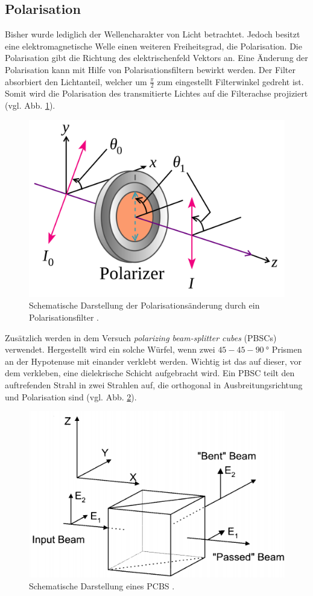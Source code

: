 \subsection{Polarisation}
Bisher wurde lediglich der Wellencharakter von Licht betrachtet. Jedoch besitzt eine
elektromagnetische Welle einen weiteren Freiheitsgrad, die Polarisation.
Die Polarisation gibt die Richtung des elektrischenfeld Vektors an.
Eine Änderung der Polarisation kann mit Hilfe von Polarisationsfiltern bewirkt werden.
Der Filter absorbiert den Lichtanteil, welcher um $\frac{\pi}{2}$ zum eingestellt Filterwinkel
gedreht ist. Somit wird die Polarisation des transmitierte Lichtes auf die Filterachse projiziert (vgl. Abb. \ref{fig:pola}).
\begin{figure}
\centering
\includegraphics[width=0.5\linewidth]{./content/images/polarisationsfilter.png}
\caption{Schematische Darstellung der Polarisationsänderung durch ein Polarisationsfilter \cite{pola}.}
\label{fig:pola}
\end{figure}

Zusätzlich werden in dem Versuch \emph{polarizing beam-splitter cubes} (PBSCs) verwendet.
Hergestellt wird ein solche Würfel, wenn zwei $45-45-\SI{90}{\degree}$ Prismen
an der Hypotenuse mit einander verklebt werden. Wichtig ist das auf dieser, vor dem verkleben,
eine dielekrische Schicht aufgebracht wird. Ein PBSC teilt den auftrefenden Strahl
in zwei Strahlen auf, die orthogonal in Ausbreitungsrichtung und Polarisation
sind (vgl. Abb. \ref{fig:pbsc}).
\begin{figure}
\centering
\includegraphics[width=0.6\linewidth]{./content/images/pbsc.png}
\caption{Schematische Darstellung eines PCBS \cite{anleitung64}.}
\label{fig:pbsc}
\end{figure}
